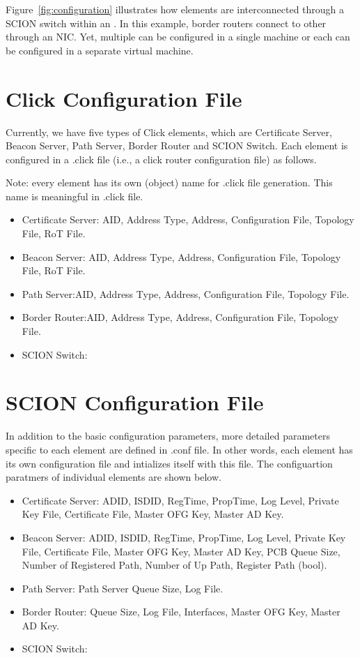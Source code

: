 Figure~\ref{fig:configuration} illustrates how elements are interconnected through a SCION switch within an \AD. In this example, border routers connect to other \ADs through an NIC. Yet, multiple \ADs can be configured in a single machine or each \AD can be configured in a separate virtual machine.


\section{Click Configuration File}
Currently, we have five types of Click elements, which are Certificate Server, Beacon Server, Path Server, Border Router and SCION Switch.  
Each element is configured in a .click file (i.e., a click router configuration file) as follows.

Note: every element has its own (object) name for .click file generation. This name is meaningful in .click file.

\begin{itemize}
\item Certificate Server: AID, Address Type, Address, Configuration File, Topology File, RoT File.
\item Beacon Server: AID, Address Type, Address, Configuration File, Topology File, RoT File.
\item Path Server:AID, Address Type, Address, Configuration File, Topology File.
\item Border Router:AID, Address Type, Address, Configuration File, Topology File.
\item SCION Switch:
\end{itemize}

\section{SCION Configuration File}
In addition to the basic configuration parameters, more detailed parameters specific to each element are defined in .conf file. In other words, each element has its own configuration file and intializes itself with this file. The configuartion paratmers of individual elements are shown below.

\begin{itemize}
\item Certificate Server: ADID, ISDID, RegTime, PropTime, Log Level, Private Key File, Certificate File, Master OFG Key, Master AD Key.
\item Beacon Server: ADID, ISDID, RegTime, PropTime, Log Level, Private Key File, Certificate File, Master OFG Key, Master AD Key, PCB Queue Size, Number of Registered Path, Number of Up Path, Register Path (bool).
\item Path Server: Path Server Queue Size,  Log File.
\item Border Router: Queue Size, Log File, Interfaces, Master OFG Key, Master AD Key. 
\item SCION Switch:
\end{itemize}


